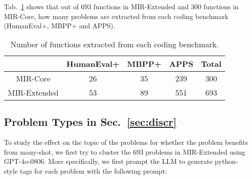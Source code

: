 Tab.~\ref{tab:data_source} shows that out of $693$ functions in MIR-Extended and $300$ functions in MIR-Core, how many problems are extracted from each coding benchmark (HumanEval+, MBPP+ and APPS).

\begin{table}[]
    \centering
    \caption{Number of functions extracted from each coding benchmark.}
    \begin{tabular}{ccccc}
        \toprule
          & HumanEval+ & MBPP+ & APPS & Total  \\
         \midrule
         MIR-Core & 26 & 35 & 239 & 300\\
         MIR-Extended & 53 & 89 & 551 & 693 \\
         \bottomrule
    \end{tabular}
    
    \label{tab:data_source}
\end{table}

\subsection{Problem Types in Sec.~\ref{sec:discr}}
\label{sec:probtype}

To study the effect on the topic of the problems for whether the problem benefits from many-shot, we first try to cluster the $693$ problems in MIR-Extended using GPT-4o-0806. More specifically, we first prompt the LLM to generate python-style tags for each problem with the following prompt:

{
\setlength{\fboxsep}{0.3cm}
}

